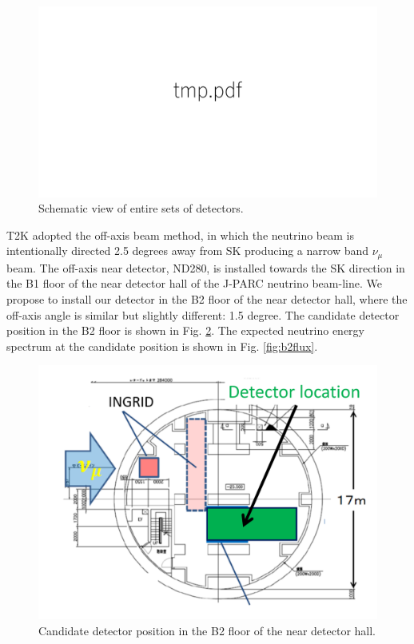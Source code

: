\begin{figure}[tbh]
\begin{center}
\includegraphics[width=0.8\linewidth]{fig/tmp.pdf}
\end{center}
\caption{
Schematic view of entire sets of detectors.
}
\label{fig:all_detector}
\end{figure}


T2K adopted the off-axis beam method, in which
the neutrino beam is intentionally directed 2.5 degrees away from SK producing a narrow band $\nu_{\mu}$ beam.
The off-axis near detector, ND280, is installed towards the SK direction in the B1 floor of the near detector hall of the J-PARC neutrino beam-line.
We propose to install our detector in the B2 floor of the near detector hall, 
where the off-axis angle is similar but slightly different: 1.5 degree.
The candidate detector position in the B2 floor is shown in Fig. \ref{fig:location}.
The expected neutrino energy spectrum at the candidate position is shown in Fig. \ref{fig:b2flux}.

\begin{figure}[tbhp]
\begin{center}
\includegraphics[width=0.6\linewidth]{fig/detector_position_b2.pdf}
\end{center}
\caption{
Candidate detector position in the B2 floor of the near detector hall.
}
\label{fig:location}
\end{figure}

